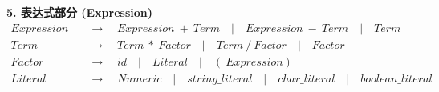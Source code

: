 \documentclass[11pt]{article}
\begin{document}
    \textbf{5. 表达式部分 (Expression)}
    \begin{align*}
        Expression &\quad \to \quad Expression\ +\ Term \quad |\quad Expression\ -\ Term \quad |\quad Term \\
        Term &\quad \to \quad Term\ *\ Factor \quad |\quad Term\ / \ Factor \quad |\quad Factor \\
        Factor &\quad \to \quad id \quad |\quad Literal \quad |\quad (\ Expression ) \\
        Literal &\quad \to \quad Numeric\quad|\quad string\_literal\quad|\quad char\_literal\quad|\quad boolean\_literal \\
    \end{align*}
\end{document}
